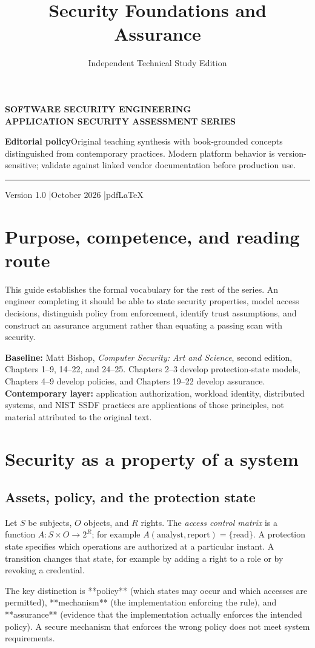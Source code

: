 \documentclass[
  letterpaper,
]{article}
\title{Security Foundations and Assurance}
\author{Independent Technical Study Edition}
\date{}
\makeatletter
\renewcommand{\maketitle}{%
 \hypersetup{pageanchor=false}%
\begin{titlepage}\thispagestyle{empty}
 \vspace*{1.5cm}{\color{brand}\rule{\textwidth}{3pt}}\par\vspace{1cm}
 {\sffamily\bfseries\color{muted}\large SOFTWARE SECURITY ENGINEERING\\ APPLICATION SECURITY ASSESSMENT SERIES}\par\vspace{1.05cm}
 {\sffamily\bfseries\color{ink}\fontsize{27}{34}\selectfont\@title\par}\vspace{0.8cm}
 {\sffamily\large\color{brand}\@author\par}\vfill
 \begin{tcolorbox}[colback=brandlight,colframe=brand!55,boxrule=0.5pt]
 \small\textbf{Editorial policy}\quad Original teaching synthesis with book-grounded concepts distinguished from contemporary practices. Modern platform behavior is version-sensitive; validate against linked vendor documentation before production use.
 \end{tcolorbox}
 {\color{brand}\rule{\textwidth}{2pt}}\par\vspace{0.3cm}
 {\sffamily\small Version 1.0 \quad|\quad October 2026 \quad|\quad pdfLaTeX}\end{titlepage}\hypersetup{pageanchor=true}\setcounter{page}{1}}
\makeatother
\begin{document}
\maketitle

{
\setcounter{tocdepth}{3}
\tableofcontents
}
\section{Purpose, competence, and reading
route}\label{purpose-competence-and-reading-route}

This guide establishes the formal vocabulary for the rest of the series.
An engineer completing it should be able to state security properties,
model access decisions, distinguish policy from enforcement, identify
trust assumptions, and construct an assurance argument rather than
equating a passing scan with security.

\textbf{Baseline:} Matt Bishop, \emph{Computer Security: Art and
Science}, second edition, Chapters 1--9, 14--22, and 24--25. Chapters
2--3 develop protection-state models, Chapters 4--9 develop policies,
and Chapters 19--22 develop assurance. \textbf{Contemporary layer:}
application authorization, workload identity, distributed systems, and
NIST SSDF practices are applications of those principles, not material
attributed to the original text.

\section{Security as a property of a
system}\label{security-as-a-property-of-a-system}

\subsection{Assets, policy, and the protection
state}\label{assets-policy-and-the-protection-state}

Let \(S\) be subjects, \(O\) objects, and \(R\) rights. The \emph{access
control matrix} is a function \(A:S\times O\to 2^R\); for example
\(A(\text{analyst},\text{report})=\{\text{read}\}\). A protection state
specifies which operations are authorized at a particular instant. A
transition changes that state, for example by adding a right to a role
or by revoking a credential.

\begin{sourceconcept}
The key distinction is **policy** (which states may occur and which accesses are permitted), **mechanism** (the implementation enforcing the rule), and **assurance** (evidence that the implementation actually enforces the intended policy). A secure mechanism that enforces the wrong policy does not meet system requirements.
\end{sourceconcept}
\end{document}
